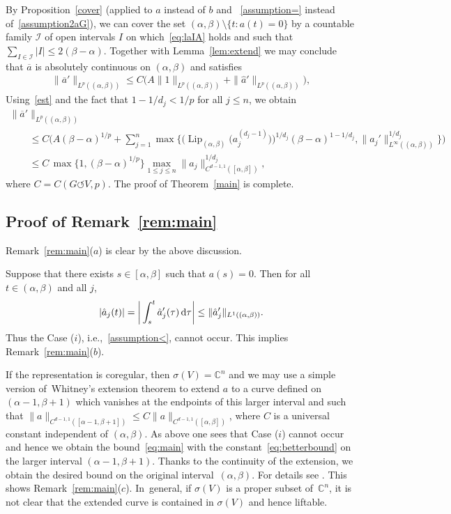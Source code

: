 \documentclass[pdftex]{sigma}
\numberwithin{equation}{section}
\def\al{\alpha}
\def\be{\beta}
\def\si{\sigma}
\def\ta{\tau}
\def\C{\mathbb{C}}
\def\cI{\mathcal{I}}
\def\ol{\overline}
\def\Lip{\on{Lip}}
\def\we{\hat}
\def\acts{\circlearrowleft}
\let\on=\operatorname
\begin{document}
 By Proposition~\ref{cover} (applied to $a$ instead of $b$ and
~\eqref{assumption=} instead of~\eqref{assumption2aG}),
 we can cover the set
 $(\al,\be) \setminus \{t \colon a(t) = 0\}$
by a countable family $\cI$ of open intervals $I$ on which~\eqref{eq:laIA} holds and such that
$\sum_{I \in \cI} |I| \le 2 (\be - \al)$.
Together with Lemma~\ref{lem:extend} we may conclude that
$\ol a$ is absolutely continuous on $(\al,\be)$ and satisfies
\begin{gather*}
 \|\ol a'\|_{L^p((\al,\be))} \le C \big(A \|1\|_{L^p((\al,\be))}
 + \|\we a'\|_{L^p ((\al,\be))}\big),
\end{gather*}
Using~\eqref{est} and the fact that $1 - 1/d_j < 1/p$ for all $j \le n$, we obtain
\begin{gather*}
 \|\ol a'\|_{L^p((\al,\be))}
 \\ \qquad
{} \le C \bigg(A (\be - \al)^{1/p}
+ \sum_{j=1}^n \max \big\{\big (\Lip_{(\al,\be)}\big( a_j^{(d_j-1)}\big)\big)^{1/d_j} (\be -\al)^{1-1/d_j}, \|a_j'\|^{1/d_j}_{L^\infty((\al,\be))}
 \big\} \bigg)
 \\ \qquad
{}\le C\, \max\big\{1, (\be-\al)^{1/p} \big\} \max_{1 \le j \le n} \|a_j\|^{1/d_j}_{C^{d-1,1}([\al, \be])},
\end{gather*}
where $C = C(G \acts V,p)$.
The proof of Theorem~\ref{main} is complete.

\subsection*{Proof of Remark~\ref{rem:main}}

Remark~\ref{rem:main}($a$) is clear by the above discussion.

Suppose that there exists $s \in [\al,\be]$ such that $a(s) = 0$. Then for all $t \in (\al,\be)$ and all $j$,
\begin{gather*}
 |\we a_j (t)| = \bigg| \int_{s}^t \we a_j'(\ta)\,{\rm d}\ta\bigg| \le \|\we a_j'\|_{L^1((\al,\be))}.
\end{gather*}
Thus the Case ($i$), i.e.,~\eqref{assumption<}, cannot occur. This implies Remark~\ref{rem:main}($b$).

If the representation is coregular, then $\si(V) = \C^n$ and we may use a simple version of~Whitney's extension theorem to
extend $a$ to a curve defined on $(\al- 1,\be +1)$ which vanishes at the endpoints of this larger interval
and such that $\|a\|_{C^{d-1,1}([\al -1,\be +1])} \le C \|a\|_{C^{d-1,1}([\al,\be])}$, where $C$ is a
universal constant independent of $(\al,\be)$.
As above one sees that
Case ($i$) cannot occur and hence we obtain the bound~\eqref{eq:main} with the constant~\eqref{eq:betterbound}
on the larger interval $(\al- 1,\be +1)$. Thanks to the continuity of the extension, we obtain the desired bound
on the original inter\-val~$(\al,\be)$.
For details see \cite{ParusinskiRainer15}.
This shows Remark~\ref{rem:main}($c$). In~general, if $\si(V)$ is a proper subset of~$\C^n$, it is not clear
that the extended curve is contained in $\si(V)$ and hence liftable.
\end{document}
